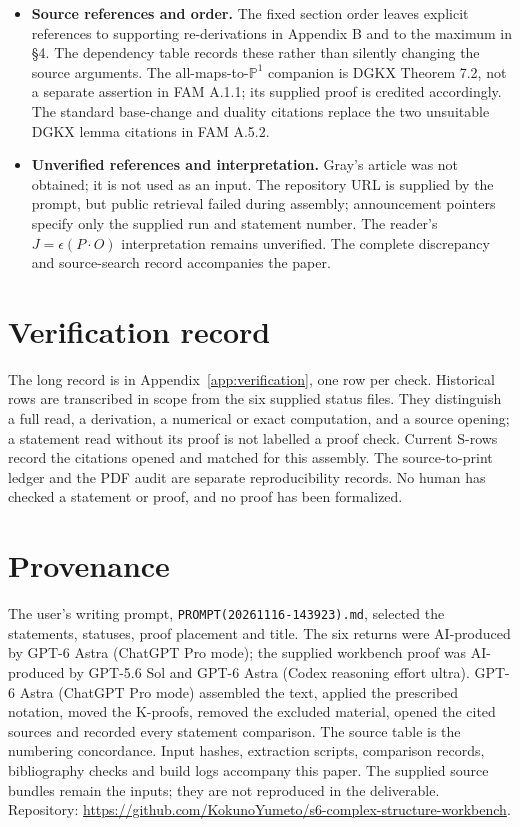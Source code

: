 \documentclass[11pt,a4paper]{article}
\theoremstyle{plain}
\theoremstyle{definition}
\begin{document}
\begin{itemize}[leftmargin=*]
\item \textbf{Source references and order.} The fixed section order leaves explicit references to supporting re-derivations in Appendix B and to the maximum in \S4. The dependency table records these rather than silently changing the source arguments. The all-maps-to-$\mathbb P^1$ companion is DGKX Theorem 7.2, not a separate assertion in FAM A.1.1; its supplied proof is credited accordingly. The standard base-change and duality citations replace the two unsuitable DGKX lemma citations in FAM A.5.2.
\item \textbf{Unverified references and interpretation.} Gray's article was not obtained; it is not used as an input. The repository URL is supplied by the prompt, but public retrieval failed during assembly; announcement pointers specify only the supplied run and statement number. The reader's $J=\epsilon(P\cdot O)$ interpretation remains unverified. The complete discrepancy and source-search record accompanies the paper.
\end{itemize}

\section*{Verification record}
The long record is in Appendix~\ref{app:verification}, one row per check. Historical rows are transcribed in scope from the six supplied status files. They distinguish a full read, a derivation, a numerical or exact computation, and a source opening; a statement read without its proof is not labelled a proof check. Current S-rows record the citations opened and matched for this assembly. The source-to-print ledger and the PDF audit are separate reproducibility records. No human has checked a statement or proof, and no proof has been formalized.

\section*{Provenance}
The user's writing prompt, \texttt{PROMPT(20261116-143923).md}, selected the statements, statuses, proof placement and title. The six returns were AI-produced by GPT-6 Astra (ChatGPT Pro mode); the supplied workbench proof was AI-produced by GPT-5.6 Sol and GPT-6 Astra (Codex reasoning effort ultra). GPT-6 Astra (ChatGPT Pro mode) assembled the text, applied the prescribed notation, moved the K-proofs, removed the excluded material, opened the cited sources and recorded every statement comparison. The source table is the numbering concordance. Input hashes, extraction scripts, comparison records, bibliography checks and build logs accompany this paper. The supplied source bundles remain the inputs; they are not reproduced in the deliverable. Repository: \url{https://github.com/KokunoYumeto/s6-complex-structure-workbench}.
\end{document}
